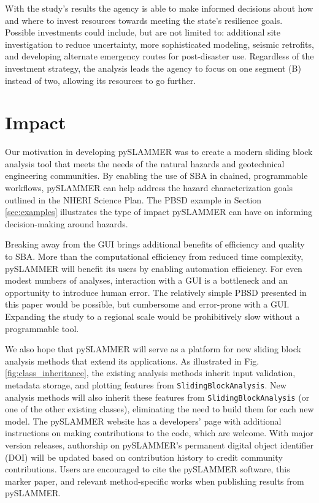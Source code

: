 \documentclass[preprint,review,12pt]{elsarticle}
\begin{document}
With the study's results the agency is able to make informed decisions about how and where to invest resources towards meeting the state's resilience goals.
Possible investments could include, but are not limited to: additional site investigation to reduce uncertainty, more sophisticated modeling, seismic retrofits, and developing alternate emergency routes for post-disaster use.
Regardless of the investment strategy, the analysis leads the agency to focus on one segment (B) instead of two, allowing its resources to go further.


\section{Impact}

Our motivation in developing pySLAMMER was to create a modern sliding block analysis tool that meets the needs of the natural hazards and geotechnical engineering communities.
By enabling the use of SBA in chained, programmable workflows, pySLAMMER can help address the hazard characterization goals outlined in the NHERI Science Plan.
The PBSD example in Section \ref{sec:examples} illustrates the type of impact pySLAMMER can have on informing decision-making around hazards.

Breaking away from the GUI brings additional benefits of efficiency and quality to SBA.
More than the computational efficiency from reduced time complexity, pySLAMMER will benefit its users by enabling automation efficiency.
For even modest numbers of analyses, interaction with a GUI is a bottleneck and an opportunity to introduce human error.
The relatively simple PBSD presented in this paper would be possible, but cumbersome and error-prone with a GUI.
Expanding the study to a regional scale would be prohibitively slow without a programmable tool.

We also hope that pySLAMMER will serve as a platform for new sliding block analysis methods that extend its applications.
As illustrated in Fig. \ref{fig:class_inheritance}, the existing analysis methods inherit input validation, metadata storage, and plotting features from \texttt{SlidingBlockAnalysis}.
New analysis methods will also inherit these features from \texttt{SlidingBlockAnalysis} (or one of the other existing classes), eliminating the need to build them for each new model.
The pySLAMMER website has a developers' page with additional instructions on making contributions to the code, which are welcome.
With major version releases, authorship on pySLAMMER's permanent digital object identifier (DOI) will be updated based on contribution history to credit community contributions.
Users are encouraged to cite the pySLAMMER software, this marker paper, and relevant method-specific works when publishing results from pySLAMMER.
\end{document}
